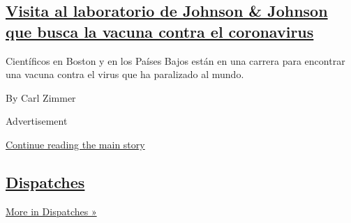 \begin{enumerate}
  \hypertarget{visita-al-laboratorio-de-johnson--johnson-que-busca-la-vacuna-contra-el-coronavirus}{%
  \subsection{\texorpdfstring{\href{/es/2020/07/23/espanol/ciencia-y-tecnologia/vacuna-coronavirus.html}{Visita
  al laboratorio de Johnson \& Johnson que busca la vacuna contra el
  coronavirus}}{Visita al laboratorio de Johnson \& Johnson que busca la vacuna contra el coronavirus}}\label{visita-al-laboratorio-de-johnson--johnson-que-busca-la-vacuna-contra-el-coronavirus}}

  Científicos en Boston y en los Países Bajos están en una carrera para
  encontrar una vacuna contra el virus que ha paralizado al mundo.

  By Carl Zimmer
\end{enumerate}

Advertisement

\protect\hyperlink{after-mid2}{Continue reading the main story}

\hypertarget{dispatches}{%
\subsection{\texorpdfstring{\href{/spotlight/dispatches-international}{Dispatches}}{Dispatches}}\label{dispatches}}

\href{/spotlight/dispatches-international}{More in Dispatches »}

